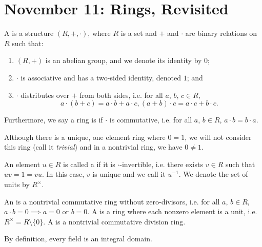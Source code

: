 \section{November 11: Rings, Revisited}

\begin{defbox}
    A  is a structure $(R, +, \cdot)$, where $R$ is a set and $+$ and $\cdot$ are binary relations on $R$ such that:
    \begin{enumerate}
        \item $(R, +)$ is an abelian group, and we denote its identity by $0$;
        \item $\cdot$ is associative and has a two-sided identity, denoted $1$; and
        \item $\cdot$ distributes over $+$ from both sides, i.e. for all $a$, $b$, $c \in R$,
        \[ a \cdot (b + c) = a \cdot b + a \cdot c, (a + b) \cdot c = a \cdot c + b \cdot c. \] 
    \end{enumerate}
    Furthermore, we say a ring is  if $\cdot$ is commutative, i.e. for all $a$, $b \in R$, $a \cdot b = b \cdot a$.
\end{defbox}

Although there is a unique, one element ring where $0 = 1$, we will not consider this ring (call it \textit{trivial}) and in a nontrivial ring, we have $0 \neq 1$.

\begin{defbox}
    An element $u \in R$ is called a  if it is $\cdot$-invertible, i.e. there exists $v \in R$ such that $uv = 1 = vu$. In this case, $v$ is unique and we call it $u^{-1}$. We denote the set of units by $R^\times$. 
\end{defbox}

\begin{defbox}
    An  is a nontrivial commutative ring without zero-divisors, i.e. for all $a$, $b \in R$, $a \cdot b = 0 \implies a = 0$ or $b = 0$. A  is a ring where each nonzero element is a unit, i.e. $R^\times = R \setminus \{0\}$. A  is a nontrivial commutative division ring. 
\end{defbox}

\begin{remark}
    By definition, every field is an integral domain. 
\end{remark}

